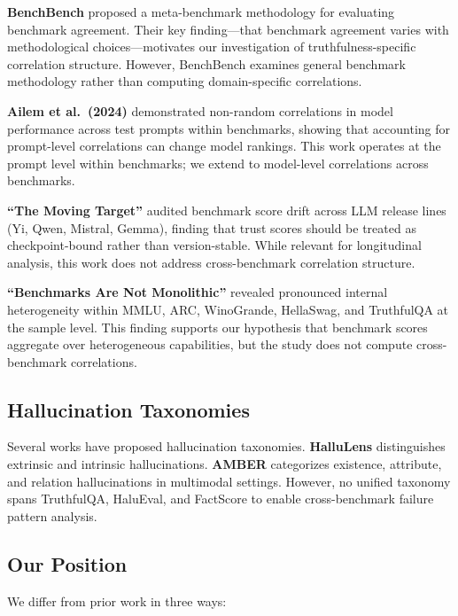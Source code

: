 \textbf{BenchBench} \cite{perlitz2024benchbench} proposed a meta-benchmark methodology for evaluating benchmark agreement. Their key finding---that benchmark agreement varies with methodological choices---motivates our investigation of truthfulness-specific correlation structure. However, BenchBench examines general benchmark methodology rather than computing domain-specific correlations.

\textbf{Ailem et al.\ (2024)} \cite{ailem2024robustness} demonstrated non-random correlations in model performance across test prompts within benchmarks, showing that accounting for prompt-level correlations can change model rankings. This work operates at the prompt level within benchmarks; we extend to model-level correlations across benchmarks.

\textbf{``The Moving Target''} \cite{fan2026movingtarget} audited benchmark score drift across LLM release lines (Yi, Qwen, Mistral, Gemma), finding that trust scores should be treated as checkpoint-bound rather than version-stable. While relevant for longitudinal analysis, this work does not address cross-benchmark correlation structure.

\textbf{``Benchmarks Are Not Monolithic''} \cite{siedler2026benchmarksmonolithic} revealed pronounced internal heterogeneity within MMLU, ARC, WinoGrande, HellaSwag, and TruthfulQA at the sample level. This finding supports our hypothesis that benchmark scores aggregate over heterogeneous capabilities, but the study does not compute cross-benchmark correlations.

\subsection{Hallucination Taxonomies}

Several works have proposed hallucination taxonomies. \textbf{HalluLens} \cite{bang2025hallulens} distinguishes extrinsic and intrinsic hallucinations. \textbf{AMBER} \cite{wang2023amber} categorizes existence, attribute, and relation hallucinations in multimodal settings. However, no unified taxonomy spans TruthfulQA, HaluEval, and FactScore to enable cross-benchmark failure pattern analysis.

\subsection{Our Position}

We differ from prior work in three ways:


